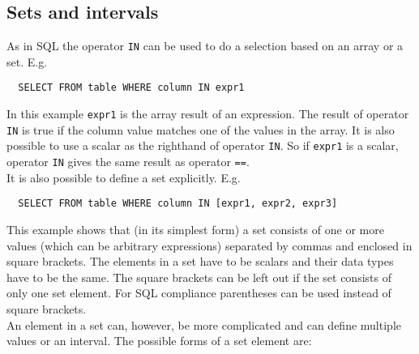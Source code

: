 \subsection{\label{TAQL:SETS}Sets and intervals}
As in SQL the operator \texttt{IN} can be used to do a selection
based on an array or a set. E.g.
\begin{verbatim}
  SELECT FROM table WHERE column IN expr1
\end{verbatim}
In this example \texttt{expr1} is the array result of an expression. The result
of operator \texttt{IN} is true if the column value matches one of the
values in the array. It is also possible to use a scalar as the
righthand of operator \texttt{IN}.
So if \texttt{expr1} is a scalar, operator \texttt{IN}
gives the same result as operator \texttt{==}.
\\It is also possible to define a set explicitly. E.g.
\begin{verbatim}
  SELECT FROM table WHERE column IN [expr1, expr2, expr3]
\end{verbatim}
This example shows that (in its simplest form) a set
consists of one or more values (which
can be arbitrary expressions) separated by commas and enclosed in
square brackets. The elements in a set have to be scalars and their
data types have to be the same. The square brackets can be left out if
the set consists of only one set element. For SQL compliance
parentheses can be used instead of square brackets.
\\An element in a set can, however, be more complicated and can
define multiple values or an interval. The possible forms of
a set element are:
